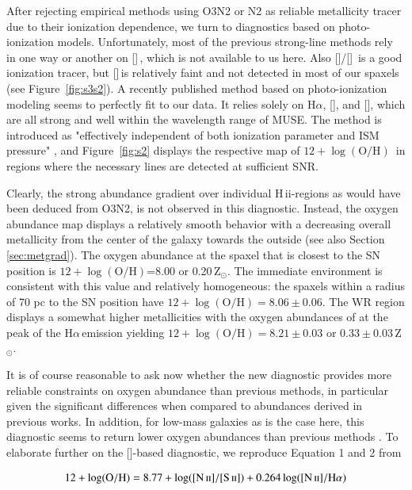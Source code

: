 \documentclass[traditabstract]{aa}
\newcommand{\ha}{H$\alpha$}
\newcommand{\hii}{\mbox{H\,{\sc ii}}}
\newcommand{\oh}{$12+\log(\mathrm{O/H})$}
\newcommand{\sii}{[\ion{S}{ii}]}
\newcommand{\siii}{[\ion{S}{iii}]}
\newcommand{\oii}{[\ion{O}{ii}]}
\newcommand{\nii}{[\ion{N}{ii}]}
\begin{document}
After rejecting empirical methods using O3N2 or N2 as reliable metallicity tracer due to their ionization dependence, we turn to diagnostics based on photo-ionization models. Unfortunately, most of the previous strong-line methods rely in one way or another on \oii\,\citep{2002ApJS..142...35K}, which is not available to us here. Also \siii/\sii\, is a good ionization tracer, but \siii\,is relatively faint and not detected in most of our spaxels (see Figure~\ref{fig:s3s2}). A recently published method based on photo-ionization modeling \citep{2016Ap&SS.361...61D} seems to perfectly fit to our data. It relies solely on \ha, \nii, and \sii, which are all strong and well within the wavelength range of MUSE. The method is introduced as "effectively independent of both ionization parameter and ISM pressure" \citep{2016Ap&SS.361...61D}, and Figure~\ref{fig:s2} displays the respective map of \oh\, in regions where the necessary lines are detected at sufficient SNR.

Clearly, the strong abundance gradient over individual \hii-regions as would have been deduced from O3N2, is not observed in this diagnostic. Instead, the oxygen abundance map displays a relatively smooth behavior with a decreasing overall metallicity from the center of the galaxy towards the outside (see also Section \ref{sec:metgrad}). The oxygen abundance at the spaxel that is closest to the SN position is \oh=8.00 or 0.20\,Z$_{\odot}$. The immediate environment is consistent with this value and relatively homogeneous: the spaxels within a radius of 70 pc to the SN position have \oh$=8.06\pm 0.06$. The WR region displays a somewhat higher metallicities with the oxygen abundances of at the peak of the \ha\,emission yielding \oh$=8.21\pm 0.03$ or $0.33\pm0.03\,$Z$_{\odot}$.

It is of course reasonable to ask now whether the new \citet{2016Ap&SS.361...61D} diagnostic provides more reliable constraints on oxygen abundance than previous methods, in particular given the significant differences when compared to abundances derived in previous works. In addition, for low-mass galaxies as is the case here, this diagnostic seems to return lower oxygen abundances than previous methods \citep{2016ApJ...823L..24K}. To elaborate further on the \sii-based diagnostic, we reproduce Equation 1 and 2 from \citet{2016Ap&SS.361...61D}

\begin{equation}
12+\log(\mathrm{O/H}) = 8.77 + \log([\ion{N}{ii}]/[\ion{S}{ii}]) + 0.264\log([\ion{N}{ii}]/\mathrm{H}\alpha)
\end{equation}
\end{document}
